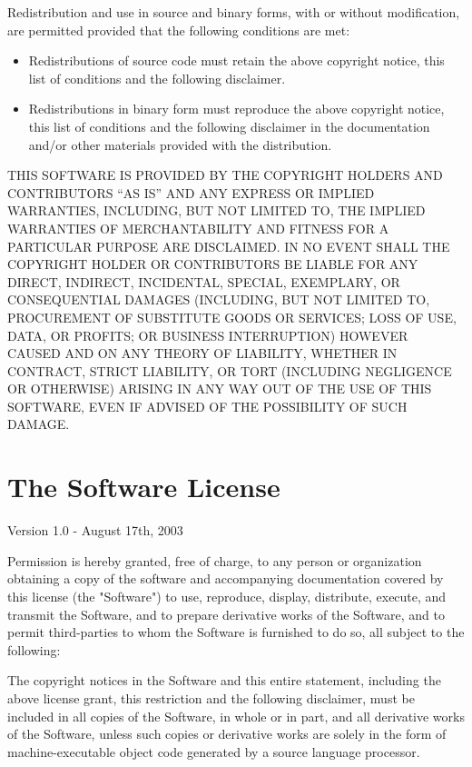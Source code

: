Redistribution and use in source and binary forms, with or without
modification, are permitted provided that the following conditions are
met:

\begin{itemize}
\itemsep1pt\parskip0pt
\item
  Redistributions of source code must retain the above copyright notice,
  this list of conditions and the following disclaimer.
\item
  Redistributions in binary form must reproduce the above copyright
  notice, this list of conditions and the following disclaimer in the
  documentation and/or other materials provided with the distribution.
\end{itemize}

THIS SOFTWARE IS PROVIDED BY THE COPYRIGHT HOLDERS AND CONTRIBUTORS ``AS
IS'' AND ANY EXPRESS OR IMPLIED WARRANTIES, INCLUDING, BUT NOT LIMITED
TO, THE IMPLIED WARRANTIES OF MERCHANTABILITY AND FITNESS FOR A
PARTICULAR PURPOSE ARE DISCLAIMED. IN NO EVENT SHALL THE COPYRIGHT
HOLDER OR CONTRIBUTORS BE LIABLE FOR ANY DIRECT, INDIRECT, INCIDENTAL,
SPECIAL, EXEMPLARY, OR CONSEQUENTIAL DAMAGES (INCLUDING, BUT NOT LIMITED
TO, PROCUREMENT OF SUBSTITUTE GOODS OR SERVICES; LOSS OF USE, DATA, OR
PROFITS; OR BUSINESS INTERRUPTION) HOWEVER CAUSED AND ON ANY THEORY OF
LIABILITY, WHETHER IN CONTRACT, STRICT LIABILITY, OR TORT (INCLUDING
NEGLIGENCE OR OTHERWISE) ARISING IN ANY WAY OUT OF THE USE OF THIS
SOFTWARE, EVEN IF ADVISED OF THE POSSIBILITY OF SUCH DAMAGE.

\section{The \boost Software License}
\label{boost_license}

Version 1.0 - August 17th, 2003

Permission is hereby granted, free of charge, to any person or organization
obtaining a copy of the software and accompanying documentation covered by
this license (the "Software") to use, reproduce, display, distribute,
execute, and transmit the Software, and to prepare derivative works of the
Software, and to permit third-parties to whom the Software is furnished to
do so, all subject to the following:

The copyright notices in the Software and this entire statement, including
the above license grant, this restriction and the following disclaimer,
must be included in all copies of the Software, in whole or in part, and
all derivative works of the Software, unless such copies or derivative
works are solely in the form of machine-executable object code generated by
a source language processor.

